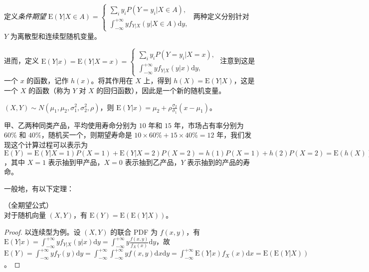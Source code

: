 \documentclass[../main.tex]{subfiles}
\begin{document}
定义\emph{条件期望} $\mathrm E(Y|X\in A)=\left\{
    \begin{aligned}
        \sum_iy_iP(Y=y_i|X\in A), \\
        \int_{-\infty}^{+\infty}yf_{Y|X}(y|X\in A)\mathrm dy,
    \end{aligned}\right.$ 两种定义分别针对 $Y$ 为离散型和连续型随机变量。

进而，定义 $\mathrm E(Y|x)=\mathrm E(Y|X=x)=\left\{
    \begin{aligned}
        \sum_iy_iP(Y=y_i|X=x), \\
        \int_{-\infty}^{+\infty}yf_{Y|X}(y|x)\mathrm dy,
    \end{aligned}\right.$ 注意到这是一个 $x$ 的函数，记作 $h(x)$。将其作用在 $X$ 上，得到 $h(X)=\mathrm E(Y|X)$，这是一个 $X$ 的函数（称为 $Y$ 对 $X$ 的回归函数），因此是一个新的随机变量。

\begin{example}
    $(X,Y)\sim N(\mu_1,\mu_2,\sigma_1^2,\sigma_2^2,\rho)$，则 $\mathrm E(Y|x)=\mu_2+\rho\frac{\sigma_2}{\sigma_1}(x-\mu_1)$。
\end{example}

\begin{example}
    甲、乙两种同类产品，平均使用寿命分别为 $10$ 年和 $15$ 年，市场占有率分别为 $60\%$ 和 $40\%$，随机买一个，则期望寿命是 $10\times 60\%+15\times 40\%=12$ 年，我们发现这个计算过程可以表示为 $\mathrm E(Y)=\mathrm E(Y|X=1)P(X=1)+\mathrm E(Y|X=2)P(X=2)=h(1)P(X=1)+h(2)P(X=2)=\mathrm E(h(X))=\mathrm E(\mathrm E(Y|X))$，其中 $X=1$ 表示抽到甲产品，$X=0$ 表示抽到乙产品，$Y$ 表示抽到的产品的寿命。
\end{example}

一般地，有以下定理：

\begin{theorem}\label{thm:4.7.1}
    （全期望公式）\\
    对于随机向量 $(X,Y)$，有 $\mathrm E(Y)=\mathrm E(\mathrm E(Y|X))$。
\end{theorem}

\begin{proof}
    以连续型为例。设 $(X,Y)$ 的联合 PDF 为 $f(x,y)$，有 $\mathrm E(Y|x)=\int_{-\infty}^{+\infty}yf_{Y|X}(y|x)\mathrm dy=\int_{-\infty}^{+\infty}y\frac{f(x,y)}{f_X(x)}\mathrm dy$，故 $\mathrm E(Y)=\int_{-\infty}^{+\infty}yf_Y(y)\mathrm dy=\int_{-\infty}^{+\infty}\int_{-\infty}^{+\infty}yf(x,y)\mathrm dx\mathrm dy=\int_{-\infty}^{+\infty}\mathrm E(Y|x)f_X(x)\mathrm dx=\mathrm E(\mathrm E(Y|X))$。
\end{proof}
\end{document}
